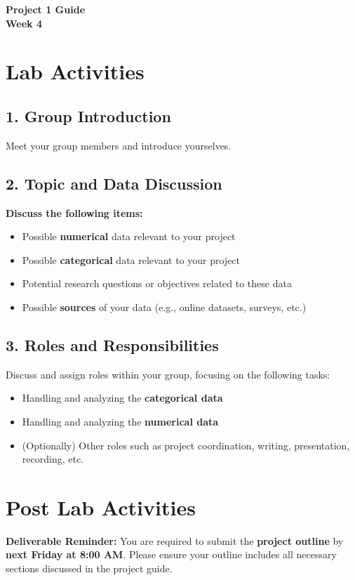 \documentclass[12pt]{article}
\begin{document}
\begin{center}
    \textbf{\LARGE Project 1 Guide \\ Week 4}
\end{center}

\vspace{1em}

\section*{Lab Activities}

\subsection*{1. Group Introduction}
Meet your group members and introduce yourselves.  
\vspace{6\baselineskip}

\subsection*{2. Topic and Data Discussion}

\textbf{Discuss the following items:}

\begin{itemize}
    \item Possible \textbf{numerical} data relevant to your project
    \item Possible \textbf{categorical} data relevant to your project
    \item Potential research questions or objectives related to these data
    \item Possible \textbf{sources} of your data (e.g., online datasets, surveys, etc.)
\end{itemize}

\vspace{2\baselineskip}

\subsection*{3. Roles and Responsibilities}
Discuss and assign roles within your group, focusing on the following tasks:
\begin{itemize}
    \item Handling and analyzing the \textbf{categorical data}
    \item Handling and analyzing the \textbf{numerical data}
    \item (Optionally) Other roles such as project coordination, writing, presentation, recording, etc.
\end{itemize}

\vspace{6\baselineskip}

\section*{Post Lab Activities}

\noindent \textbf{Deliverable Reminder:}  
You are required to submit the \textbf{project outline} by \textbf{next Friday at 8:00 AM}. Please ensure your outline includes all necessary sections discussed in the project guide.
\end{document}
